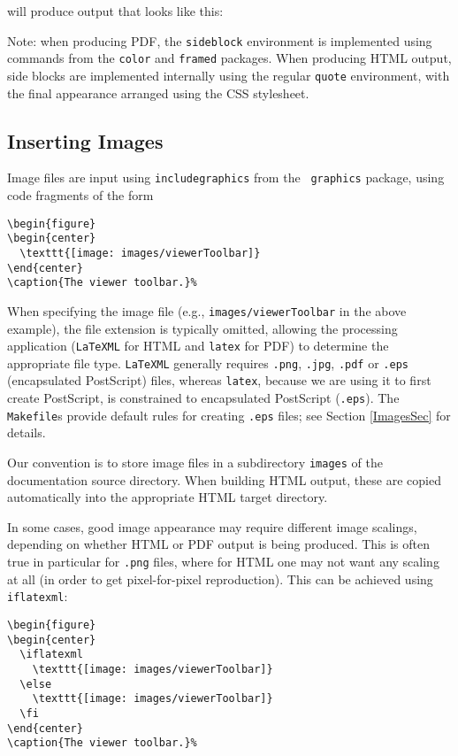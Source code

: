 \documentclass{article}
\begin{document}
will produce output that looks like this:

\begin{sideblock}
Note: when producing PDF, the {\tt sideblock} environment
is implemented using commands from the {\tt color} and
{\tt framed} packages. When producing HTML output, side blocks
are implemented internally using the
regular {\tt quote} environment, with the final appearance arranged
using the CSS stylesheet. 
\end{sideblock}

\subsection{Inserting Images}
\label{InsertingImagesSec}

Image files are input using {\tt \BKS includegraphics} from the {\tt
graphics} package, using code fragments of the form
%
\begin{lstlisting}[]
\begin{figure}
\begin{center}
  \texttt{[image: images/viewerToolbar]}
\end{center}
\caption{The viewer toolbar.}%
\end{lstlisting}
%
When specifying the image file (e.g., {\tt images/viewerToolbar} in
the above example), the file extension is typically omitted, allowing
the processing application ({\tt LaTeXML} for HTML and {\tt latex} for
PDF) to determine the appropriate file type.  {\tt LaTeXML} generally
requires {\tt .png}, {\tt .jpg}, {\tt .pdf} or {\tt .eps}
(encapsulated PostScript) files, whereas {\tt latex}, because we are
using it to first create PostScript, is constrained to
encapsulated PostScript ({\tt .eps}). The {\tt Makefile}s
provide default rules for creating {\tt .eps} files; see Section
\ref{ImagesSec} for details.

Our convention is to store image files in a subdirectory {\tt images}
of the documentation source directory. When building HTML output,
these are copied automatically into the appropriate HTML target directory.

In some cases, good image appearance may require different image
scalings, depending on whether HTML or PDF output is being
produced. This is often true in particular for {\tt .png} files, where
for HTML one may not want any scaling at all (in order to get
pixel-for-pixel reproduction). This can be achieved using
{\tt \BKS iflatexml}:

\begin{lstlisting}[]
\begin{figure}
\begin{center}
  \iflatexml
    \texttt{[image: images/viewerToolbar]}
  \else
    \texttt{[image: images/viewerToolbar]}
  \fi
\end{center}
\caption{The viewer toolbar.}%
\end{lstlisting}
\end{document}
